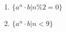 \begin{enumerate}
	\item $\{a^n \cdot b | n \% 2 = 0  \} $
	\item $\{a^n \cdot b | n < 9 \} $
\end{enumerate}
